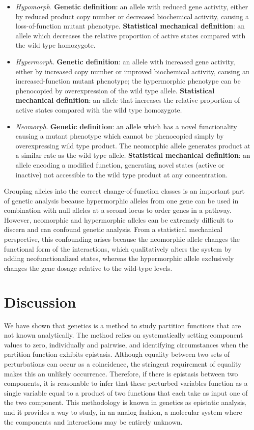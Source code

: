 \begin{itemize}
  \item \emph{Hypomorph}. \textbf{Genetic definition}: an allele with reduced
  gene activity, either by reduced product copy number or decreased biochemical
  activity, causing a loss-of-function mutant phenotype. \textbf{Statistical
  mechanical definition}: an allele which decreases the relative proportion of
  active states compared with the wild type homozygote.
  \item \emph{Hypermorph}. \textbf{Genetic definition}: an allele with increased
  gene activity, either by increased copy number or improved biochemical
  activity, causing an increased-function mutant phenotype; the hypermorphic
  phenotype can be phenocopied by overexpression of the wild type allele.
  \textbf{Statistical mechanical definition}: an allele that increases the
  relative proportion of active states compared with the wild type homozygote.
  \item \emph{Neomorph}. \textbf{Genetic definition}: an allele which has a
  novel functionality causing a mutant phenotype which cannot be phenocopied
  simply by overexpressing wild type product. The neomorphic allele generates
  product at a similar rate as the wild type allele. \textbf{Statistical
  mechanical definition}: an allele encoding a modified \Freg{} function,
  generating novel states (active or inactive) not accessible to the wild type
  product at any concentration.
\end{itemize}

Grouping alleles into the correct change-of-function classes is an important
part of genetic analysis because hypermorphic alleles from one gene can be used
in combination with null alleles at a second locus to order genes in a pathway.
However, neomorphic and hypermorphic alleles can be extremely difficult to
discern and can confound genetic analysis. From a statistical mechanical
perspective, this confounding arises because the neomorphic allele
changes the functional form of the interactions, which qualitatively alters
the system by adding neofunctionalized states, whereas the hypermorphic allele
exclusively changes the gene dosage relative to the wild-type levels.

\section*{Discussion}
We have shown that genetics is a method to study partition
functions that are not known analytically. The method relies on systematically
setting component values to zero, individually and pairwise, and identifying
circumstances when the partition function exhibits epistasis. Although equality
between two sets of perturbations can occur as a coincidence, the stringent
requirement of equality makes this an unlikely occurrence. Therefore, if
there is epistasis between two components, it is reasonable to infer that these
perturbed variables function as a single variable equal to a product of two
functions that each take as input one of the two component. This methodology is
known in genetics as epistatic analysis, and it provides a way to study, in an
analog fashion, a molecular system where the components and interactions may be
entirely unknown.

